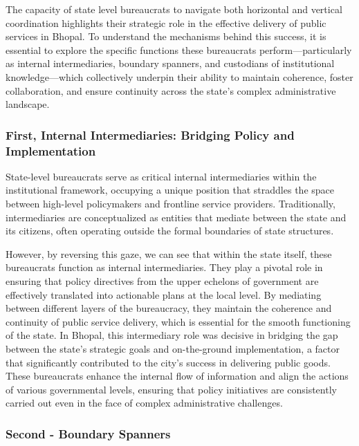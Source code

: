The capacity of state level bureaucrats to navigate both horizontal and vertical coordination highlights their strategic role in the effective delivery of public services in Bhopal. To understand the mechanisms behind this success, it is essential to explore the specific functions these bureaucrats perform—particularly as internal intermediaries, boundary spanners, and custodians of institutional knowledge—which collectively underpin their ability to maintain coherence, foster collaboration, and ensure continuity across the state's complex administrative landscape.

\subsubsection{First, Internal Intermediaries: Bridging Policy and Implementation}

State-level bureaucrats serve as critical internal intermediaries within the institutional framework, occupying a unique position that straddles the space between high-level policymakers and frontline service providers. Traditionally, intermediaries are conceptualized as entities that mediate between the state and its citizens, often operating outside the formal boundaries of state structures.

However, by reversing this gaze, we can see that within the state itself, these bureaucrats function as internal intermediaries. They play a pivotal role in ensuring that policy directives from the upper echelons of government are effectively translated into actionable plans at the local level. By mediating between different layers of the bureaucracy, they maintain the coherence and continuity of public service delivery, which is essential for the smooth functioning of the state. In Bhopal, this intermediary role was decisive in bridging the gap between the state's strategic goals and on-the-ground implementation, a factor that significantly contributed to the city's success in delivering public goods. These bureaucrats enhance the internal flow of information and align the actions of various governmental levels, ensuring that policy initiatives are consistently carried out even in the face of complex administrative challenges.

\subsubsection{Second - Boundary Spanners}


